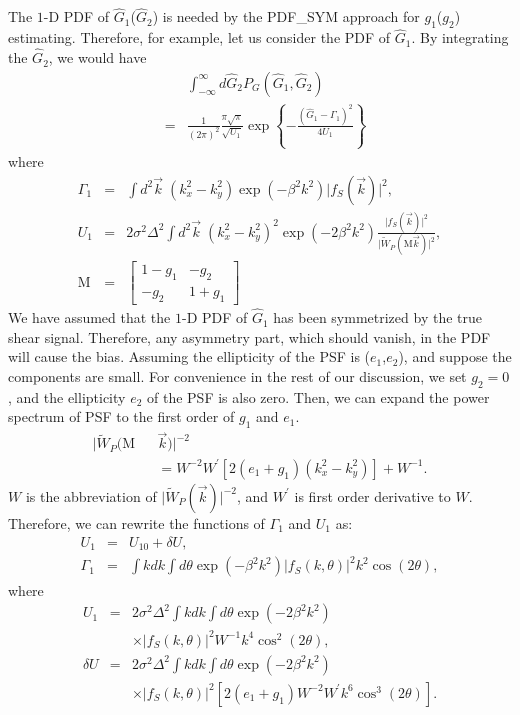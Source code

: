 \documentclass[twocolumn]{aastex62}
\begin{document}
The $1$-D PDF of $\hat{G}_1$($\hat{G}_2$) is needed by the PDF\_SYM approach for $g_1$($g_2$) estimating. Therefore, for example, let us consider the PDF of $\hat{G}_1$. By integrating the $\hat{G}_2$, we would have
\begin{eqnarray}
\label{1d_PDF}
&&\int_{-\infty}^{\infty}d\hat{G}_2 P_G\left(\hat{G}_1,\hat{G}_2\right)\\ \nonumber
&=&\frac{1}{(2\pi)^2}\frac{\pi\sqrt{\pi}}{\sqrt{U_1}}\exp\left\{-\frac{\left(\hat{G}_1-\Gamma_1\right)^2}{4U_1}\right\}
\end{eqnarray}
where
\begin{eqnarray}
\Gamma_1&=&\int{d}^2\vec{k}\;\left(k_x^2-k_y^2\right)\exp(-\beta^2k^2)\vert f_S(\vec{k})\vert^2, \\ \nonumber
U_1&=&2\sigma^2\Delta^2\int{d}^2\vec{k} \; \left(k_x^2-k_y^2\right)^2\exp(-2\beta^2k^2)\frac{\vert f_S(\vec{k})\vert^2}{\vert \widetilde{W}_{P}(\mathrm{M}\vec{k})\vert^2}, \\ \nonumber
\mathrm{M}&=&\left[\begin{array}{cc}
1-g_1 &  -g_2 \\
-g_2 &  1+g_1 
\end{array}\right]
\end{eqnarray}
We have assumed that the $1$-D PDF of $\hat{G}_1$ has been symmetrized by the true shear signal. Therefore, any asymmetry part, which should vanish, in the PDF will cause the bias. Assuming the ellipticity of the PSF is ($e_1$,$e_2$), and suppose the components are small. For convenience in the rest of our discussion, we set $g_2=0$, and the ellipticity $e_2$ of the PSF is also zero. Then, we can expand the power spectrum of PSF to the first order of $g_1$ and $e_1$.
\begin{eqnarray}
\vert \widetilde{W}_{P}(\mathrm{M}&&\vec{k})\vert^{-2} \\ \nonumber
&&= W^{-2}W^\prime [2(e_1+g_1)(k_x^2-k_y^2)]
+W^{-1}.
\end{eqnarray}
$W$ is the abbreviation of $\vert \widetilde{W}_{P}(\vec{k})\vert^{-2}$, and $W^\prime$ is first order derivative to $W$.
Therefore, we can rewrite the functions of $\Gamma_1$ and $U_1$ as:
\begin{eqnarray}
U_1&=&U_{10}+\delta U,\\ \nonumber
\Gamma_1&=&\int kdk\int d\theta \exp(-\beta^2k^2)\vert f_S(k,\theta)\vert^2k^2\cos(2\theta),
\end{eqnarray}
where
\begin{eqnarray}
U_1 &=& 2\sigma^2\Delta^2\int kdk\int d\theta\exp(-2\beta^2k^2) \\ \nonumber
&&\times\vert f_S(k,\theta)\vert^2W^{-1}k^4 \cos^2(2\theta), \\ \nonumber
\delta U &=& 2\sigma^2\Delta^2\int kdk\int d\theta\exp(-2\beta^2k^2) \\ \nonumber
&&\times\vert f_S(k,\theta)\vert^2\left[ 2(e_1+g_1)W^{-2}W^\prime k^6\cos^3(2\theta)\right].
\end{eqnarray}
\end{document}
